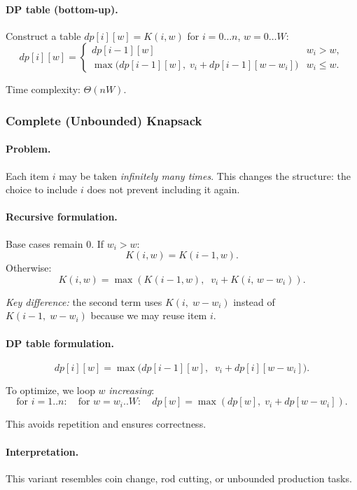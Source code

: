 \documentclass[9pt]{extarticle}
\begin{document}
\paragraph{DP table (bottom-up).}
Construct a table $dp[i][w] = K(i,w)$ for $i=0\dots n$, $w=0\dots W$:
\[
dp[i][w] =
\begin{cases}
dp[i-1][w] & w_i > w,\\[6pt]
\max\bigl(dp[i-1][w],\; v_i + dp[i-1][w-w_i]\bigr) & w_i \le w.
\end{cases}
\]

Time complexity: $\Theta(nW)$.

\subsubsection{Complete (Unbounded) Knapsack}

\paragraph{Problem.}
Each item $i$ may be taken \emph{infinitely many times}.  
This changes the structure: the choice to include $i$ does not prevent 
including it again.

\paragraph{Recursive formulation.}
Base cases remain $0$.  If $w_i > w$:
\[
K(i,w) = K(i-1,w).
\]
Otherwise:
\[
K(i,w) = \max\left(K(i-1,w),\;\; v_i + K(i,\, w-w_i)\right).
\]

\emph{Key difference:} the second term uses $K(i,\; w-w_i)$ instead of
$K(i-1,\;w-w_i)$ because we may reuse item $i$.

\paragraph{DP table formulation.}
\[
dp[i][w] =
\max\bigl(dp[i-1][w],\;\; v_i + dp[i][w-w_i]\bigr).
\]

To optimize, we loop $w$ \emph{increasing}:
\[
\text{for } i=1..n:
\quad
\text{for } w=w_i..W:
\quad
dp[w] = \max(dp[w],\; v_i + dp[w-w_i]).
\]

This avoids repetition and ensures correctness.

\paragraph{Interpretation.}
This variant resembles coin change, rod cutting, or unbounded production tasks.
\end{document}
